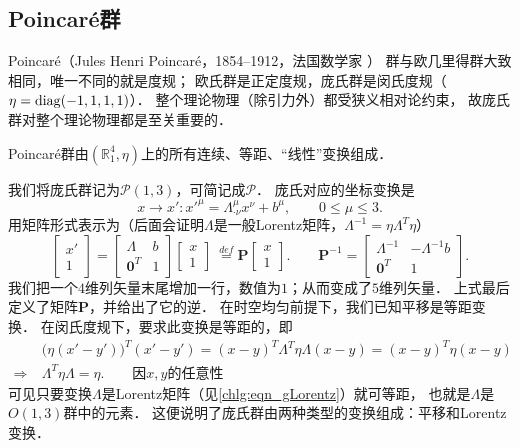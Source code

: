 \subsection{Poincar\'{e}群}\label{chlg:sec_Poincare-group}
Poincar\'{e}（Jules Henri Poincar\'e，1854--1912，法国数学家 ）
群与欧几里得群大致相同，唯一不同的就是度规；
欧氏群是正定度规，庞氏群是闵氏度规（$\eta={\rm diag}(-1,1,1,1)$）．
整个理论物理（除引力外）都受狭义相对论约束，
故庞氏群对整个理论物理都是至关重要的．
\begin{definition}
    Poincar\'{e}群由$(\mathbb{R}^4_1,\eta)$上的所有连续、等距、“线性”变换组成．
\end{definition}
我们将庞氏群记为$\mathcal{P}(1,3)$，可简记成$\mathcal{P}$．
庞氏对应的坐标变换是
\begin{equation}\label{chlg:eqn_xpoincare}
    x\to x' : x'^{\mu} = \Lambda^\mu_{\cdot \nu }x^\nu + b^\mu ,\qquad  0 \leqslant \mu \leqslant 3 .
\end{equation}
用矩阵形式表示为（后面会证明$\Lambda$是一般Lorentz矩阵，$\Lambda^{-1}=\eta \Lambda^T \eta$）
\begin{equation}\label{chlg:eqn_xP5m}
    \begin{bmatrix}  x' \\ 1 \end{bmatrix} =
    \begin{bmatrix}  \Lambda & b \\ \boldsymbol{0}^T & 1  \end{bmatrix}
    \begin{bmatrix}  x \\ 1 \end{bmatrix} 
    \  \overset{def}{=} \boldsymbol{P} \begin{bmatrix}  x \\ 1 \end{bmatrix} .
    \qquad \boldsymbol{P}^{-1} = 
    \begin{bmatrix}    \Lambda^{-1} & -\Lambda^{-1} b \\ \boldsymbol{0}^T & 1    \end{bmatrix} .
\end{equation}
我们把一个$4$维列矢量末尾增加一行，数值为$1$；从而变成了$5$维列矢量．
上式最后定义了矩阵$\boldsymbol{P}$，并给出了它的逆．
在时空均匀前提下，我们已知平移是等距变换．
在闵氏度规下，要求此变换是等距的，即
    \begin{align*}
        &\bigl(\eta(x'-y')\bigr)^T (x'-y') = ( x - y )^T \Lambda^T \eta \Lambda ( x - y )= (x-y)^T \eta (x-y)\\
        \Rightarrow\ &\Lambda^T \eta \Lambda = \eta .     \qquad \text{因}x,y \text{的任意性}
    \end{align*}
可见只要变换$\Lambda$是Lorentz矩阵（见\eqref{chlg:eqn_gLorentz}）就可等距，
也就是$\Lambda$是$O(1,3)$群中的元素．
这便说明了庞氏群由两种类型的变换组成：平移和Lorentz变换．

